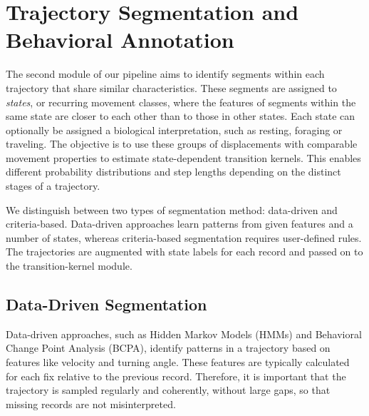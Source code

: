
\chapter{Trajectory Segmentation and Behavioral Annotation}
\label{ch:segmentation}
The second module of our pipeline aims to identify segments within each trajectory that share similar characteristics.
These segments are assigned to \emph{states}, or recurring movement classes, where the features of segments within the same state are closer to each other than to those in other states.
Each state can optionally be assigned a biological interpretation, such as resting, foraging or traveling.
The objective is to use these groups of displacements with comparable movement properties to estimate state-dependent transition kernels.
This enables different probability distributions and step lengths depending on the distinct stages of a trajectory.

We distinguish between two types of segmentation method: data-driven and criteria-based.
Data-driven approaches learn patterns from given features and a number of states, whereas criteria-based segmentation requires user-defined rules.
The trajectories are augmented with state labels for each record and passed on to the transition-kernel module.


\section{Data-Driven Segmentation}
\label{sec:data-driven-segmentation}
Data-driven approaches, such as Hidden Markov Models (HMMs) and Behavioral Change Point Analysis (BCPA), identify patterns in a trajectory based on features like velocity and turning angle.
These features are typically calculated for each fix relative to the previous record.
Therefore, it is important that the trajectory is sampled regularly and coherently, without large gaps, so that missing records are not misinterpreted.

